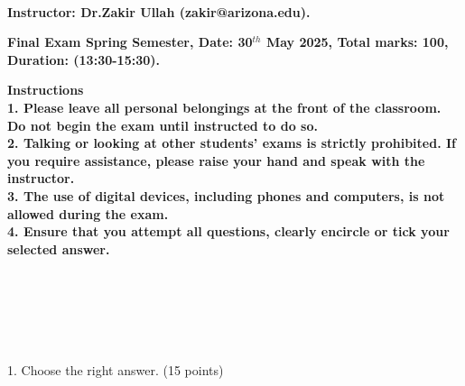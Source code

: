\documentclass[6pt]{article}
\begin{document}
\Large
\begin{center}
\\
\vspace{40pt}
\bf Instructor: Dr.Zakir Ullah (zakir@arizona.edu).\\
\vspace{40pt}
\end       {center}

\vspace{40pt}
\begin{center}

\bf Final Exam Spring Semester, Date: 30$^{th}$ May 2025, Total marks: 100,  Duration: (13:30-15:30).
\end{center}
\vspace{5pt}
\vspace{20pt}

\bf Instructions \\
1. Please leave all personal belongings at the front of the classroom. Do not begin the exam until instructed to do so.\\
2. Talking or looking at other students' exams is strictly prohibited. If you require assistance, please raise your hand and speak with the instructor.\\
3. The use of digital devices, including phones and computers, is not allowed during the exam.\\
4. Ensure that you attempt all questions, clearly encircle or tick your selected answer.


\vspace{10pt}

\\
\vspace{10pt}

\\
\vspace{10pt}

\\

\vspace{100pt}
\large

1. Choose the right answer. (15 points)
\end{document}
